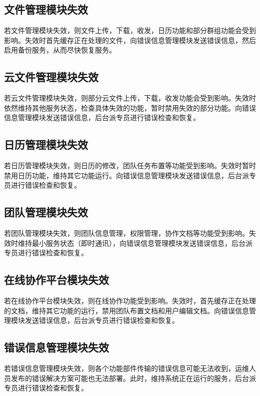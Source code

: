 \subsection{文件管理模块失效}
若文件管理模块失效，则文件上传，下载，收发，日历功能和部分群组功能会受到影响。失效时首先缓存正在处理的文件，向错误信息管理模块发送错误信息，然后启用备份服务，从而尽快恢复服务。
\subsection{云文件管理模块失效}
若云文件管理模块失效，则部分云文件上传，下载，收发功能会受到影响。失效时依然维持其他服务状态，检查具体失效的功能，暂时禁用失效的部分功能。向错误信息管理模块发送错误信息，后台派专员进行错误检查和恢复。
\subsection{日历管理模块失效}
若日历管理模块失效，则日历的修改，团队任务布置等功能受到影响。失效时暂时禁用日历功能，维持其它功能运行。向错误信息管理模块发送错误信息，后台派专员进行错误检查和恢复。
\subsection{团队管理模块失效}
若团队管理模块失效，则团队信息管理，权限管理，协作文档等功能受到影响。失效时维持最小服务状态（即时通讯），向错误信息管理模块发送错误信息，后台派专员进行错误检查和恢复。
\subsection{在线协作平台模块失效}
若在线协作平台模块失效，则在线协作功能受到影响。失效时，首先缓存正在处理的文档，维持其它功能的运行，禁用团队布置文档和用户编辑文档。向错误信息管理模块发送错误信息，后台派专员进行错误检查和恢复。
\subsection{错误信息管理模块失效}
若错误信息管理模块失效，则各个功能部件传输的错误信息可能无法收到，运维人员发布的错误解决方案可能也无法部署。此时，维持系统正在运行的服务，后台派专员进行错误检查和恢复。
